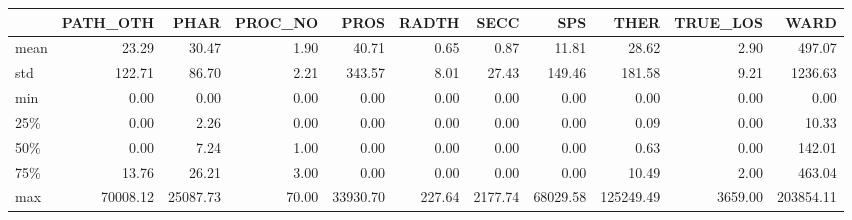 \begin{tabular}{lrrrrrrrrrr}
\toprule
{} &  PATH\_OTH &      PHAR &  PROC\_NO &      PROS &   RADTH &     SECC &       SPS &       THER &  TRUE\_LOS &       WARD \\
\midrule
mean &     23.29 &     30.47 &     1.90 &     40.71 &    0.65 &     0.87 &     11.81 &      28.62 &      2.90 &     497.07 \\
std  &    122.71 &     86.70 &     2.21 &    343.57 &    8.01 &    27.43 &    149.46 &     181.58 &      9.21 &    1236.63 \\
min  &      0.00 &      0.00 &     0.00 &      0.00 &    0.00 &     0.00 &      0.00 &       0.00 &      0.00 &       0.00 \\
25\%  &      0.00 &      2.26 &     0.00 &      0.00 &    0.00 &     0.00 &      0.00 &       0.09 &      0.00 &      10.33 \\
50\%  &      0.00 &      7.24 &     1.00 &      0.00 &    0.00 &     0.00 &      0.00 &       0.63 &      0.00 &     142.01 \\
75\%  &     13.76 &     26.21 &     3.00 &      0.00 &    0.00 &     0.00 &      0.00 &      10.49 &      2.00 &     463.04 \\
max  &  70008.12 &  25087.73 &    70.00 &  33930.70 &  227.64 &  2177.74 &  68029.58 &  125249.49 &   3659.00 &  203854.11 \\
\bottomrule
\end{tabular}

